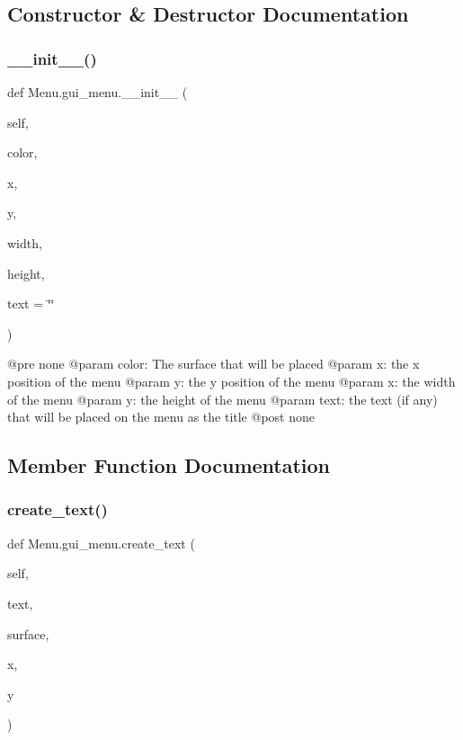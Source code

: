 \subsection{Constructor \& Destructor Documentation}
\mbox{\label{class_menu_1_1gui__menu_a7f56e985286036aab075ffc3ad231aaa}} 
\subsubsection{\texorpdfstring{\+\_\+\+\_\+init\+\_\+\+\_\+()}{\_\_init\_\_()}}
{\footnotesize\ttfamily def Menu.\+gui\+\_\+menu.\+\_\+\+\_\+init\+\_\+\+\_\+ (\begin{DoxyParamCaption}\item[{}]{self,  }\item[{}]{color,  }\item[{}]{x,  }\item[{}]{y,  }\item[{}]{width,  }\item[{}]{height,  }\item[{}]{text = {\ttfamily \char`\"{}\char`\"{}} }\end{DoxyParamCaption})}

\begin{DoxyVerb}@pre none
@param color: The surface that will be placed
@param x: the x position of the menu
@param y: the y position of the menu
@param x: the width of the menu
@param y: the height of the menu
@param text: the text (if any) that will be placed on the menu as the title
@post none
\end{DoxyVerb}
 

\subsection{Member Function Documentation}
\mbox{\label{class_menu_1_1gui__menu_aaf07fce7fe5c6d6d48e2a0a2d93895e8}} 
\subsubsection{\texorpdfstring{create\+\_\+text()}{create\_text()}}
{\footnotesize\ttfamily def Menu.\+gui\+\_\+menu.\+create\+\_\+text (\begin{DoxyParamCaption}\item[{}]{self,  }\item[{}]{text,  }\item[{}]{surface,  }\item[{}]{x,  }\item[{}]{y }\end{DoxyParamCaption})}

